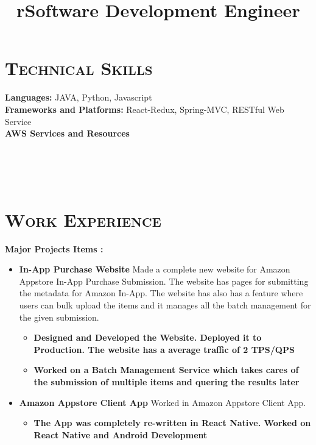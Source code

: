 \begin{resume}


\section{\textsc{Technical Skills}}
\textbf{Languages:}  JAVA, Python, Javascript \\
\textbf{Frameworks and Platforms:}  React-Redux, Spring-MVC, RESTful Web Service \\
\textbf{AWS Services and Resources}



\begin{formatb}
  \title{r}\\
  \\
  \body\\
\end{formatb}

\section{\textsc{Work Experience}}


\title{Software Development Engineer}
\begin{position}
\textbf{Major Projects Items :}
\begin{itemize}
\item \textbf{In-App Purchase Website} Made a complete new website for Amazon Appstore In-App Purchase Submission. The website has pages for submitting the metadata for Amazon In-App. The website has also has a feature where users can bulk upload the items and it manages all the batch management for the given submission.

\begin{itemize}
    \item \textbf{Designed and Developed the Website. Deployed it to Production. The website has a average traffic of 2 TPS/QPS}
    \item \textbf{Worked on a Batch Management Service which takes cares of the submission of multiple items and quering the results later }
\end{itemize}

\item \textbf{Amazon Appstore Client App} Worked in Amazon Appstore Client App. 

\begin{itemize}
    \item \textbf{The App was completely re-written in React Native. Worked on React Native and Android Development }
\end{itemize}


\end{itemize}
\end{position}
\end{resume}

